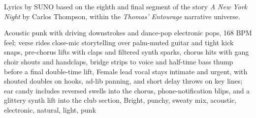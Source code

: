 
\begin{notes}
Lyrics by SUNO based on the eighth and final segment of the story \emph{A New York Night} by Carlos Thompson, %
within the \emph{Thomas’ Entourage} narrative universe.
\end{notes}
\begin{style}
Acoustic punk with driving downstrokes and dance-pop electronic pops, 168 BPM feel; verse rides close-mic storytelling over palm-muted guitar and tight kick snaps, pre-chorus lifts with claps and filtered synth sparks, chorus hits with gang choir shouts and handclaps, bridge strips to voice and half-time bass thump before a final double-time lift, Female lead vocal stays intimate and urgent, with shouted doubles on hooks, ad-lib panning, and short delay throws on key lines; ear candy includes reversed swells into the chorus, phone-notification blips, and a glittery synth lift into the club section, Bright, punchy, sweaty mix, acoustic, electronic, natural, light, punk
\end{style}
